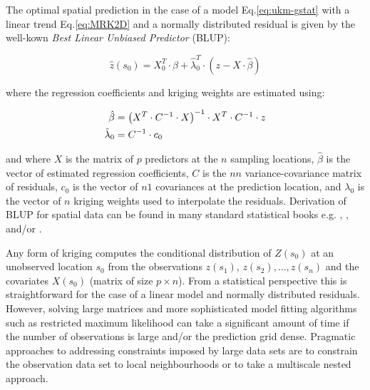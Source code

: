 \documentclass[graybox,natbib,nospthms,UStrade]{svmono}
\begin{document}
The optimal spatial prediction in the case of a model
Eq.\eqref{eq:ukm-gstat} with a linear trend Eq.\eqref{eq:MRK2D} and a
normally distributed residual is given by the well-kown \emph{Best Linear
Unbiased Predictor} (BLUP):

\[\label{E:BLUP}
\hat z({{{s}}_0}) = {{X}}_{{0}}^{{T}}\cdot \hat{{\beta}} + \hat{{\lambda}}_{{0}}^{{T}}\cdot({{z}} - {{X}}\cdot \hat{{\beta}} )\]

where the regression coefficients and kriging weights are estimated
using:

\begin{equation}
\begin{aligned}
\hat{{\beta}}  &= {\left( {{{{X}}^{{T}}}\cdot{{{C}}^{ - {{1}}}}\cdot{{X}}} \right)^{ - {{1}}}}\cdot{{{X}}^{{T}}}\cdot{{{C}}^{ - {{1}}}}\cdot{{z}} \\
\hat{{\lambda}}_{{0}} &= {C}^{ - {{1}}} \cdot {{c}}_{{0}} \notag\end{aligned}
\label{eq:betas}
\end{equation}

and where \({{X}}\) is the matrix of \(p\) predictors at the \(n\) sampling
locations, \(\hat{{\beta}}\) is the vector of estimated regression
coefficients, \({C}\) is the \(n\)\(n\) variance-covariance matrix of
residuals, \({c}_{{0}}\) is the vector of \(n\)\(1\) covariances at the
prediction location, and \({\lambda}_{{0}}\) is the vector of \(n\)
kriging weights used to interpolate the residuals. Derivation of BLUP
for spatial data can be found in many standard statistical books e.g.
\citet{Stein1999Springer}, \citet[p.277]{Christensen2001Springer},
\citet[p.425--430]{Venables2002Springer} and/or \citet{schabenberger2005statistical}.

Any form of kriging computes the conditional distribution of
\(Z({{s}}_0)\) at an unobserved location \({{s}}_0\) from the
observations \(z({{s}}_1 )\), \(z({{s}}_2 ), \ldots , z({{s}}_n )\)
and the covariates \({{X}}({{s}}_0)\) (matrix of size \(p \times n\)).
From a statistical perspective this is straightforward for the case of a
linear model and normally distributed residuals. However, solving large
matrices and more sophisticated model fitting algorithms such as
restricted maximum likelihood can take a significant amount of time if
the number of observations is large and/or the prediction grid dense.
Pragmatic approaches to addressing constraints imposed by large data
sets are to constrain the observation data set to local neighbourhoods
or to take a multiscale nested approach.
\end{document}
